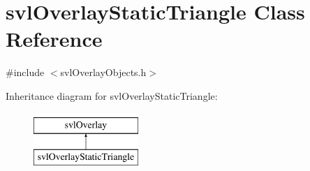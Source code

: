 \hypertarget{classsvl_overlay_static_triangle}{\section{svl\-Overlay\-Static\-Triangle Class Reference}
\label{classsvl_overlay_static_triangle}
}


{\ttfamily \#include $<$svl\-Overlay\-Objects.\-h$>$}

Inheritance diagram for svl\-Overlay\-Static\-Triangle\-:\begin{figure}[H]
\begin{center}
\leavevmode
\includegraphics[height=2.000000cm]{d9/dbd/classsvl_overlay_static_triangle}
\end{center}
\end{figure}
